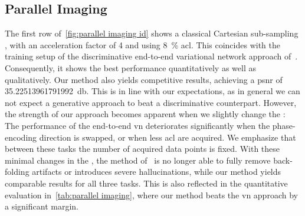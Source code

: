 \documentclass[twocolumn]{article}
\begin{document}
\subsection{Parallel Imaging}%
\label{ssec:parallel imaging}
The first row of~\cref{fig:parallel imaging id} shows a classical Cartesian sub-sampling , with an acceleration factor of \num{4} and using \qty{8}{\percent} \gls{acl}.
This coincides with the training setup of the discriminative end-to-end variational network approach of~\cite{sriram_endtoend_2020}.
Consequently, it shows the best performance quantitatively as well as qualitatively.
Our method also yields competitive results, achieving a \gls{psnr} of \qty[round-mode=places,round-precision=2]{35.22513961791992}{\decibel}.
This is in line with our expectations, as in general we can not expect a generative approach to beat a discriminative counterpart.
However, the strength of our approach becomes apparent when we slightly change the :
The performance of the end-to-end \gls{vn} deteriorates significantly when the phase-encoding direction is swapped, or when less \gls{acl} are acquired.
We emphasize that between these tasks the number of acquired data points is fixed.
With these minimal changes in the , the method of~\cite{sriram_endtoend_2020} is no longer able to fully remove back-folding artifacts or introduces severe hallucinations, while our method yields comparable results for all three tasks.
This is also reflected in the quantitative evaluation in~\cref{tab:parallel imaging}, where our method beats the \gls{vn} approach by a significant margin.
\end{document}
